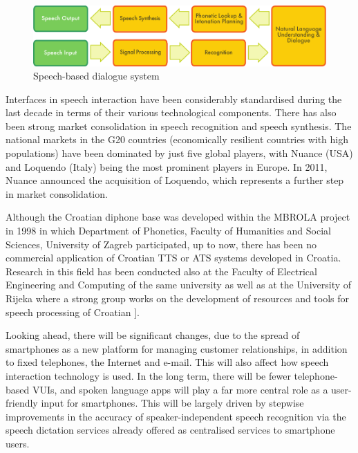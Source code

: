 \begin{multicols}{2}
\begin{figure}[t]
  \center
  \includegraphics[width=\textwidth]{../_media/english/simple_speech-based_dialogue_architecture}
  \caption{Speech-based dialogue system}
  \label{fig:dialoguearch_en}
\end{figure}

Interfaces in speech interaction have been considerably standardised during the last decade in terms of their various technological components. There has also been strong market consolidation in speech recognition and speech synthesis. The national markets in the G20 countries (economically resilient countries with high populations) have been dominated by just five global players, with Nuance (USA) and Loquendo (Italy) being the most prominent players in Europe. In 2011, Nuance announced the acquisition of Loquendo, which represents a further step in market consolidation.

Although the Croatian diphone base was developed within the MBROLA \cite{str20} project in 1998 in which Department of Phonetics, Faculty of Humanities and Social Sciences, University of Zagreb participated, up to now, there has been no commercial application of Croatian TTS or ATS systems developed in Croatia. Research in this field has been conducted also at the Faculty of Electrical Engineering and Computing of the same university \cite{art1} as well as at the University of Rijeka where a strong group works on the development of resources and tools for speech processing of Croatian \cite{str2, str21, art3}]. 

Looking ahead, there will be significant changes, due to the spread of smartphones as a new platform for managing customer relationships, in addition to fixed telephones, the Internet and e-mail. This will also affect how speech interaction technology is used. In the long term, there will be fewer telephone-based VUIs, and spoken language apps will play a far more central role as a user-friendly input for smartphones. This will be largely driven by stepwise improvements in the accuracy of speaker-independent speech recognition via the speech dictation services already offered as centralised services to smartphone users.


\end{multicols}
